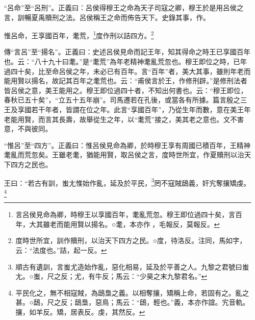 {\noindent\shu{}\fzkt “呂命”至“呂刑”。正義曰：呂侯得穆王之命為天子司寇之卿，穆王於是用呂侯之言，訓暢夏禹贖刑之法。呂侯稱王之命而佈告天下。史錄其事，作。 \par}

惟呂命，王享國百年，耄荒，\footnote{言呂侯見命為卿，時穆王以享國百年，耄亂荒忽。穆王即位過四十矣，言百年，大其雖老而能用賢以揚名。○耄，本亦作𦿗，毛報反，莫報反。}度作刑以詰四方。\footnote{度時世所宜，訓作贖刑，以治天下四方之民。○度，待洛反。注同，馬如字，云：“法度也。”詰，起一反。}


{\noindent\zhuan{}\fzbyks 傳“言呂”至“揚名”。正義曰：史述呂侯見命而記王年，知其得命之時王已享國百年也。云：“八十九十曰耄。”是“耄荒”為年老精神耄亂荒忽也。穆王即位之時，已年過四十矣，比至命呂侯之年，未必已有百年。言“百年”者，美大其事，雖則年老而能用賢以揚名，故記其百年之耄荒也。云：“甫侯言於王，作修刑辟。”是修刑法者皆呂侯之意，美王能用之。穆王即位過四十者，不知出何書也。云：“穆王即位，春秋已五十矣”，“立五十五年崩”。司馬遷若在孔後，或當各有所據。篇言殷之三王及享國若干年者，皆謂在位之年。此言“享國百年”，乃從生年而數，意在美王年老能用賢，而言其長壽，故舉從生之年，以“耄荒”接之，美其老之意也。文不害意，不與彼同。 \par}

{\noindent\shu{}\fzkt “惟呂”至“四方”。正義曰：惟呂侯見命為卿，於時穆王享有周國已積百年，王精神耄亂而荒忽矣。王雖老耄，猶能用賢，取呂侯之言，度時世所宜，作夏贖刑以治天下四方之民也。 \par}

王曰：“若古有訓，蚩尢惟始作亂，延及於平民，\footnote{順古有遺訓，言蚩尤造始作亂，惡化相易，延及於平善之人。九黎之君號曰蚩尢。○蚩，尺之反；尤，有牛反；馬云：“少昊之末九黎君名。”}罔不寇賊鴟義，奸宄奪攘矯虔。\footnote{平民化之，無不相寇賊，為鴟梟之義。以相奪攘，矯稱上命，若固有之。亂之甚。○鴟，尺之反；鴟梟，惡鳥；馬云：“鴟，輕也。”義，本亦作誼。宄音軌。攘，如羊反。矯，居表反。虔，其然反。}


